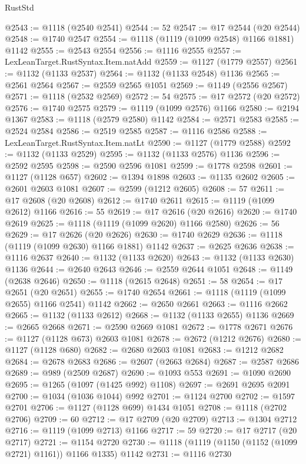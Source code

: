 \begin{lexlean}{RustStd}
\begin{coremodule}
@2543 := @1118 (@2540 @2541)
@2544 := 52
@2547 := @17 @2544 (@20 @2544)
@2548 := @1740 @2547
@2554 := @1118 (@1119 (@1099 @2548) @1166 @1881) @1142
@2555 := @2543 @2554
@2556 := @1116 @2555
@2557 := LexLeanTarget.RustSyntax.Item.natAdd
@2559 := @1127 (@1779 @2557)
@2561 := @1132 (@1133 @2537)
@2564 := @1132 (@1133 @2548) @1136
@2565 := @2561 @2564
@2567 := @2559 @2565 @1051
@2569 := @1149 (@2556 @2567)
@2571 := @1118 (@2532 @2569)
@2572 := 54
@2575 := @17 @2572 (@20 @2572)
@2576 := @1740 @2575
@2579 := @1119 (@1099 @2576) @1166
@2580 := @2194 @1367
@2583 := @1118 (@2579 @2580) @1142
@2584 := @2571 @2583
@2585 := @2524 @2584
@2586 := @2519 @2585
@2587 := @1116 @2586
@2588 := LexLeanTarget.RustSyntax.Item.natLt
@2590 := @1127 (@1779 @2588)
@2592 := @1132 (@1133 @2529)
@2595 := @1132 (@1133 @2576) @1136
@2596 := @2592 @2595
@2598 := @2590 @2596 @1081
@2599 := @1778 @2598
@2601 := @1127 (@1128 @657)
@2602 := @1394 @1898
@2603 := @1135 @2602
@2605 := @2601 @2603 @1081
@2607 := @2599 (@1212 @2605)
@2608 := 57
@2611 := @17 @2608 (@20 @2608)
@2612 := @1740 @2611
@2615 := @1119 (@1099 @2612) @1166
@2616 := 55
@2619 := @17 @2616 (@20 @2616)
@2620 := @1740 @2619
@2625 := @1118 (@1119 (@1099 @2620) @1166 @2580)
@2626 := 56
@2629 := @17 @2626 (@20 @2626)
@2630 := @1740 @2629
@2636 := @1118 (@1119 (@1099 @2630) @1166 @1881) @1142
@2637 := @2625 @2636
@2638 := @1116 @2637
@2640 := @1132 (@1133 @2620)
@2643 := @1132 (@1133 @2630) @1136
@2644 := @2640 @2643
@2646 := @2559 @2644 @1051
@2648 := @1149 (@2638 @2646)
@2650 := @1118 (@2615 @2648)
@2651 := 58
@2654 := @17 @2651 (@20 @2651)
@2655 := @1740 @2654
@2661 := @1118 (@1119 (@1099 @2655) @1166 @2541) @1142
@2662 := @2650 @2661
@2663 := @1116 @2662
@2665 := @1132 (@1133 @2612)
@2668 := @1132 (@1133 @2655) @1136
@2669 := @2665 @2668
@2671 := @2590 @2669 @1081
@2672 := @1778 @2671
@2676 := @1127 (@1128 @673) @2603 @1081
@2678 := @2672 (@1212 @2676)
@2680 := @1127 (@1128 @680)
@2682 := @2680 @2603 @1081
@2683 := @1212 @2682
@2684 := @2678 @2683
@2686 := @2607 (@2663 @2684)
@2687 := @2587 @2686
@2689 := @989 (@2509 @2687)
@2690 := @1093 @553
@2691 := @1090 @2690
@2695 := @1265 (@1097 (@1425 @992) @1108)
@2697 := @2691 @2695 @2091
@2700 := @1034 (@1036 @1044) @992
@2701 := @1124 @2700
@2702 := @1597 @2701
@2706 := @1127 (@1128 @699) @1434 @1051
@2708 := @1118 (@2702 @2706)
@2709 := 60
@2712 := @17 @2709 (@20 @2709)
@2713 := @1304 @2712
@2716 := @1119 (@1099 @2713) @1166
@2717 := 59
@2720 := @17 @2717 (@20 @2717)
@2721 := @1154 @2720
@2730 := @1118 (@1119 (@1150 (@1152 (@1099 @2721) @1161)) @1166 @1335) @1142
@2731 := @1116 @2730

\end{coremodule}
\end{lexlean}
